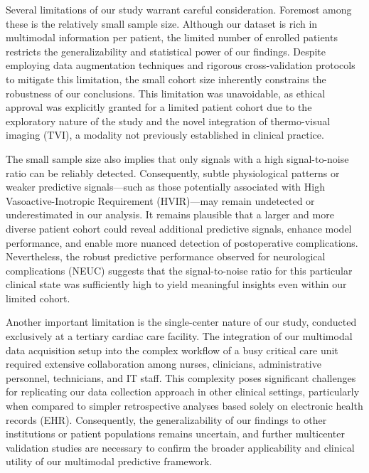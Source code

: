 Several limitations of our study warrant careful consideration. Foremost among these is the relatively small sample size. Although our dataset is rich in multimodal information per patient, the limited number of enrolled patients restricts the generalizability and statistical power of our findings. Despite employing data augmentation techniques and rigorous cross-validation protocols to mitigate this limitation, the small cohort size inherently constrains the robustness of our conclusions. This limitation was unavoidable, as ethical approval was explicitly granted for a limited patient cohort due to the exploratory nature of the study and the novel integration of thermo-visual imaging (TVI), a modality not previously established in clinical practice.

The small sample size also implies that only signals with a high signal-to-noise ratio can be reliably detected. Consequently, subtle physiological patterns or weaker predictive signals—such as those potentially associated with High Vasoactive-Inotropic Requirement (HVIR)—may remain undetected or underestimated in our analysis. It remains plausible that a larger and more diverse patient cohort could reveal additional predictive signals, enhance model performance, and enable more nuanced detection of postoperative complications. Nevertheless, the robust predictive performance observed for neurological complications (NEUC) suggests that the signal-to-noise ratio for this particular clinical state was sufficiently high to yield meaningful insights even within our limited cohort.

Another important limitation is the single-center nature of our study, conducted exclusively at a tertiary cardiac care facility. The integration of our multimodal data acquisition setup into the complex workflow of a busy critical care unit required extensive collaboration among nurses, clinicians, administrative personnel, technicians, and IT staff. This complexity poses significant challenges for replicating our data collection approach in other clinical settings, particularly when compared to simpler retrospective analyses based solely on electronic health records (EHR). Consequently, the generalizability of our findings to other institutions or patient populations remains uncertain, and further multicenter validation studies are necessary to confirm the broader applicability and clinical utility of our multimodal predictive framework.

